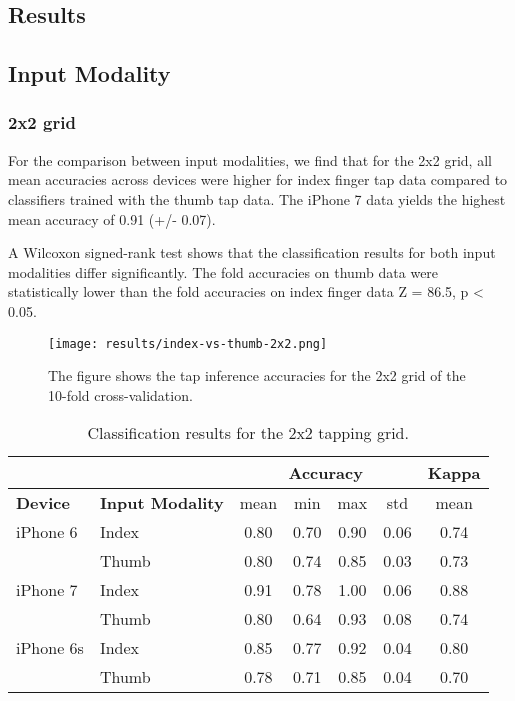 
\begin{appendix}

\section*{Results}
\subsection*{Input Modality}
\subsubsection*{2x2 grid}
For the comparison between input modalities, we find that for the 2x2 grid, all mean accuracies across devices were higher for index finger tap data compared to classifiers trained with the thumb tap data. The iPhone 7 data yields the highest mean accuracy of 0.91 (+/- 0.07).

A Wilcoxon signed-rank test shows that the classification results for both input modalities differ significantly. The fold accuracies on thumb data were statistically lower than the fold accuracies on index finger data Z = 86.5, p < 0.05.

\begin{figure}[h!]
  \centering
  \texttt{[image: results/index-vs-thumb-2x2.png]}
  \caption{The figure shows the tap inference accuracies for the 2x2 grid of the 10-fold cross-validation.} \label{fig:participation}
\end{figure}

\begin{table}[h!]
  \centering
\begin{tabular}{|l|l|c|c|c|c|c|}
  \cline{3-7}
  \multicolumn{2}{c}{} & \multicolumn{4}{|c|}{\textbf{Accuracy}} & \textbf{Kappa} \\
  \hline
  \textbf{Device} & \textbf{Input Modality} & mean &   min &   max  & std &  mean \\
  \hline
	iPhone 6 & Index &      0.80 &     0.70 &     0.90 &     0.06 &        0.74 \\
	& Thumb &      0.80 &     0.74 &     0.85 &     0.03 &        0.73 \\
	\hline
iPhone 7 & Index &      0.91 &     0.78 &     1.00 &     0.06 &        0.88 \\
	& Thumb &      0.80 &     0.64 &     0.93 &     0.08 &        0.74 \\
	\hline
iPhone 6s & Index &      0.85 &     0.77 &     0.92 &     0.04 &        0.80 \\
	& Thumb &      0.78 &     0.71 &     0.85 &     0.04 &        0.70 \\
  \hline
\end{tabular}
  \caption{Classification results for the 2x2 tapping grid.}
\end{table}


\end{appendix}
